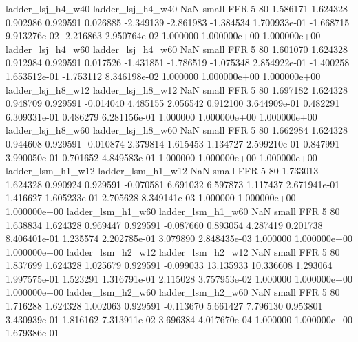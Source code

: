        ladder_lsj_h4_w40        ladder_lsj_h4_w40                   NaN      small      FFR                 5 80 1.586171       1.624328 0.902986       0.929591    0.026885     -2.349139     -2.861983    -1.384534   1.700933e-01 -1.668715 9.913276e-02    -2.216863   2.950764e-02            1.000000    1.000000e+00        1.000000e+00
       ladder_lsj_h4_w60        ladder_lsj_h4_w60                   NaN      small      FFR                 5 80 1.601070       1.624328 0.912984       0.929591    0.017526     -1.431851     -1.786519    -1.075348   2.854922e-01 -1.400258 1.653512e-01    -1.753112   8.346198e-02            1.000000    1.000000e+00        1.000000e+00
       ladder_lsj_h8_w12        ladder_lsj_h8_w12                   NaN      small      FFR                 5 80 1.697182       1.624328 0.948709       0.929591   -0.014040      4.485155      2.056542     0.912100   3.644909e-01  0.482291 6.309331e-01     0.486279   6.281156e-01            1.000000    1.000000e+00        1.000000e+00
       ladder_lsj_h8_w60        ladder_lsj_h8_w60                   NaN      small      FFR                 5 80 1.662984       1.624328 0.944608       0.929591   -0.010874      2.379814      1.615453     1.134727   2.599210e-01  0.847991 3.990050e-01     0.701652   4.849583e-01            1.000000    1.000000e+00        1.000000e+00
       ladder_lsm_h1_w12        ladder_lsm_h1_w12                   NaN      small      FFR                 5 80 1.733013       1.624328 0.990924       0.929591   -0.070581      6.691032      6.597873     1.117437   2.671941e-01  1.416627 1.605233e-01     2.705628   8.349141e-03            1.000000    1.000000e+00        1.000000e+00
       ladder_lsm_h1_w60        ladder_lsm_h1_w60                   NaN      small      FFR                 5 80 1.638834       1.624328 0.969447       0.929591   -0.087660      0.893054      4.287419     0.201738   8.406401e-01  1.235574 2.202785e-01     3.079890   2.848435e-03            1.000000    1.000000e+00        1.000000e+00
       ladder_lsm_h2_w12        ladder_lsm_h2_w12                   NaN      small      FFR                 5 80 1.837699       1.624328 1.025679       0.929591   -0.099033     13.135933     10.336608     1.293064   1.997575e-01  1.523291 1.316791e-01     2.115028   3.757953e-02            1.000000    1.000000e+00        1.000000e+00
       ladder_lsm_h2_w60        ladder_lsm_h2_w60                   NaN      small      FFR                 5 80 1.716288       1.624328 1.002063       0.929591   -0.113670      5.661427      7.796130     0.953801   3.430939e-01  1.816162 7.313911e-02     3.696384   4.017670e-04            1.000000    1.000000e+00        1.679386e-01

